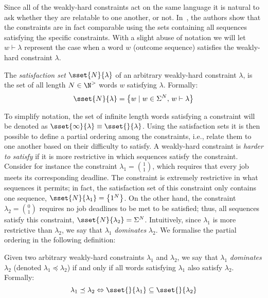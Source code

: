 Since all of the weakly-hard constraints act on the same language it is natural to ask whether they are relatable to one another, or not.
In~\cite{Bernat:2001}, the authors show that the constraints are in fact comparable using the sets containing all sequences satisfying the specific constraints.
With a slight abuse of notation we will let $w \vdash \lambda$ represent the case when a word $w$ (outcome sequence) satisfies the weakly-hard constraint $\lambda$.
%
\begin{definition}
    The \emph{satisfaction set} $\sset{N}{\lambda}$ of an arbitrary weakly-hard constraint $\lambda$, is the set of all length $N \in \N^{>}$ words $w$ satisfying $\lambda$.
    Formally:
    \begin{equation*}
        \sset{N}{\lambda} = \left\{ w \mid w \in \Sigma^N,\, w \vdash \lambda \right\}
    \end{equation*}
\end{definition}
%
To simplify notation, the set of infinite length words satisfying a constraint will be denoted as $\sset{\infty}{\lambda} \equiv \sset{}{\lambda}$.
Using the satisfaction sets it is then possible to define a partial ordering among the constraints, i.e., relate them to one another based on their difficulty to satisfy.
A weakly-hard constraint is \emph{harder to satisfy} if it is more restrictive in which sequences satisfy the constraint.
Consider for instance the constraint $\lambda_1 = \binom{1}{1}$, which requires that every job meets its corresponding deadline.
The constraint is extremely restrictive in what sequences it permits; in fact, the satisfaction set of this constraint only contains one sequence, $\sset{N}{\lambda_1} = \left\{ 1^N \right\}$.
On the other hand, the constraint $\lambda_2 = \binom{0}{1}$ requires no job deadlines to be met to be satisfied; thus, all sequences satisfy this constraint, $\sset{N}{\lambda_2} = \Sigma^N$.
Intuitively, since $\lambda_1$ is more restrictive than $\lambda_2$, we say that $\lambda_1$ \emph{dominates} $\lambda_2$.
We formalise the partial ordering in the following definition:
%
\begin{definition}%
    \label{def:kappa:dominance}%
    Given two arbitrary weakly-hard constraints $\lambda_1$ and $\lambda_2$, we say that $\lambda_1$ \emph{dominates} $\lambda_2$ (denoted $\lambda_1 \preceq \lambda_2$) if and only if all words satisfying $\lambda_1$ also satisfy $\lambda_2$.
    Formally:
    \begin{equation*}
        \lambda_1 \preceq \lambda_2 \Leftrightarrow \sset{}{\lambda_1} \subseteq \sset{}{\lambda_2}
    \end{equation*}
\end{definition}

